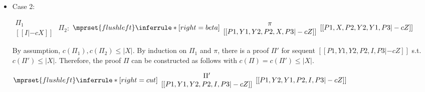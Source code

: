 \begin{itemize}
\item Case 2:
      \begin{center}
        \scriptsize
        \begin{math}
          \begin{array}{c}
            \Pi_1 \\
            {[[I |-c X]]}
          \end{array}
        \end{math}
        \qquad\qquad
        $\Pi_2$:
        \begin{math}
          $$\mprset{flushleft}
          \inferrule* [right={\tiny beta}] {
            {
              \begin{array}{c}
                \pi \\
                {[[P1, Y1, Y2, P2, X, P3 |-c Z]]}
              \end{array}
            }
          }{[[P1, X, P2, Y2, Y1, P3 |-c Z]]}
        \end{math}
      \end{center}
      By assumption, $c(\Pi_1),c(\Pi_2)\leq |X|$. By induction on $\Pi_1$
      and $\pi$, there is a proof $\Pi'$ for sequent
      $[[P1, Y1, Y2, P2, I, P3 |-c Z]]$ s.t. $c(\Pi') \leq |X|$. Therefore,
      the proof $\Pi$ can be constructed as follows with
      $c(\Pi) = c(\Pi') \leq |X|$.
      \begin{center}
        \scriptsize
        \begin{math}
          $$\mprset{flushleft}
          \inferrule* [right={\tiny cut}] {
            {
              \begin{array}{cc}
                \Pi' \\
                {[[P1, Y1, Y2, P2, I, P3 |-c Z]]}
              \end{array}
            }
          }{[[P1, Y2, Y1, P2, I, P3 |-c Z]]}
        \end{math}
      \end{center}
\end{itemize}


